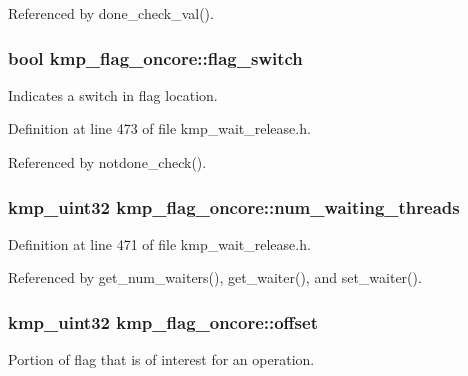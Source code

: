 Referenced by done\-\_\-check\-\_\-val().

\hypertarget{classkmp__flag__oncore_ad2e8e1e9b2eab43b88c1ae8b27e5d11b}{
\subsubsection[{flag\-\_\-switch}]{\setlength{\rightskip}{0pt plus 5cm}bool kmp\-\_\-flag\-\_\-oncore\-::flag\-\_\-switch\hspace{0.3cm}{\ttfamily [private]}}}\label{classkmp__flag__oncore_ad2e8e1e9b2eab43b88c1ae8b27e5d11b}
Indicates a switch in flag location. 

Definition at line 473 of file kmp\-\_\-wait\-\_\-release.\-h.



Referenced by notdone\-\_\-check().

\hypertarget{classkmp__flag__oncore_abce7942852f0aca2c03ac0fb83e6d855}{
\subsubsection[{num\-\_\-waiting\-\_\-threads}]{\setlength{\rightskip}{0pt plus 5cm}kmp\-\_\-uint32 kmp\-\_\-flag\-\_\-oncore\-::num\-\_\-waiting\-\_\-threads\hspace{0.3cm}{\ttfamily [private]}}}\label{classkmp__flag__oncore_abce7942852f0aca2c03ac0fb83e6d855}


Definition at line 471 of file kmp\-\_\-wait\-\_\-release.\-h.



Referenced by get\-\_\-num\-\_\-waiters(), get\-\_\-waiter(), and set\-\_\-waiter().

\hypertarget{classkmp__flag__oncore_a0b7c21b4972769775517c46ea0b41bc5}{
\subsubsection[{offset}]{\setlength{\rightskip}{0pt plus 5cm}kmp\-\_\-uint32 kmp\-\_\-flag\-\_\-oncore\-::offset\hspace{0.3cm}{\ttfamily [private]}}}\label{classkmp__flag__oncore_a0b7c21b4972769775517c46ea0b41bc5}
Portion of flag that is of interest for an operation. 

